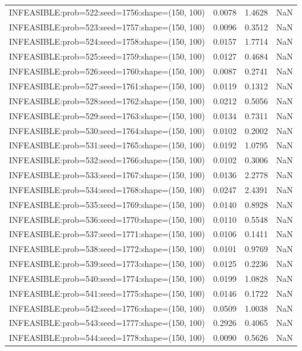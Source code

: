 \begin{longtable}{lccc}
INFEASIBLE:prob=522:seed=1756:shape=(150, 100) & 0.0078 &  1.4628 &    NaN \\
INFEASIBLE:prob=523:seed=1757:shape=(150, 100) & 0.0096 &  0.3512 &    NaN \\
INFEASIBLE:prob=524:seed=1758:shape=(150, 100) & 0.0157 &  1.7714 &    NaN \\
INFEASIBLE:prob=525:seed=1759:shape=(150, 100) & 0.0127 &  0.4684 &    NaN \\
INFEASIBLE:prob=526:seed=1760:shape=(150, 100) & 0.0087 &  0.2741 &    NaN \\
INFEASIBLE:prob=527:seed=1761:shape=(150, 100) & 0.0119 &  0.1312 &    NaN \\
INFEASIBLE:prob=528:seed=1762:shape=(150, 100) & 0.0212 &  0.5056 &    NaN \\
INFEASIBLE:prob=529:seed=1763:shape=(150, 100) & 0.0134 &  0.7311 &    NaN \\
INFEASIBLE:prob=530:seed=1764:shape=(150, 100) & 0.0102 &  0.2002 &    NaN \\
INFEASIBLE:prob=531:seed=1765:shape=(150, 100) & 0.0192 &  1.0795 &    NaN \\
INFEASIBLE:prob=532:seed=1766:shape=(150, 100) & 0.0102 &  0.3006 &    NaN \\
INFEASIBLE:prob=533:seed=1767:shape=(150, 100) & 0.0136 &  2.2778 &    NaN \\
INFEASIBLE:prob=534:seed=1768:shape=(150, 100) & 0.0247 &  2.4391 &    NaN \\
INFEASIBLE:prob=535:seed=1769:shape=(150, 100) & 0.0140 &  0.8928 &    NaN \\
INFEASIBLE:prob=536:seed=1770:shape=(150, 100) & 0.0110 &  0.5548 &    NaN \\
INFEASIBLE:prob=537:seed=1771:shape=(150, 100) & 0.0106 &  0.1411 &    NaN \\
INFEASIBLE:prob=538:seed=1772:shape=(150, 100) & 0.0101 &  0.9769 &    NaN \\
INFEASIBLE:prob=539:seed=1773:shape=(150, 100) & 0.0125 &  0.2236 &    NaN \\
INFEASIBLE:prob=540:seed=1774:shape=(150, 100) & 0.0199 &  1.0828 &    NaN \\
INFEASIBLE:prob=541:seed=1775:shape=(150, 100) & 0.0146 &  0.1722 &    NaN \\
INFEASIBLE:prob=542:seed=1776:shape=(150, 100) & 0.0509 &  1.0038 &    NaN \\
INFEASIBLE:prob=543:seed=1777:shape=(150, 100) & 0.2926 &  0.4065 &    NaN \\
INFEASIBLE:prob=544:seed=1778:shape=(150, 100) & 0.0090 &  0.5626 &    NaN \\

\end{longtable}
